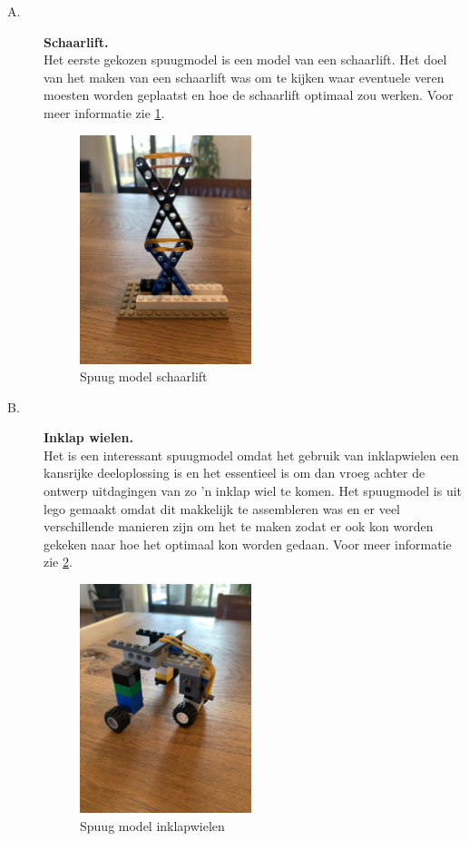 \begin{description}
\item[A.] {\bf Schaarlift.}\\ 
Het eerste gekozen spuugmodel is een model van een schaarlift. Het doel van het maken van een schaarlift was om te kijken waar eventuele veren moesten worden geplaatst en hoe de schaarlift optimaal zou werken.  Voor meer informatie zie \cref{fig:plaatje_schaarlift}.

\begin{figure}[H]
\centering

    \includegraphics[width = 50mm, angle =270 ]{04_idee_ontwikkeling/IMG_0892.jpg}
    \caption{Spuug model schaarlift}
    \label{fig:plaatje_schaarlift}
\end{figure}

\vspace{\baselineskip}

\item[B.] {\bf Inklap wielen.}\\
Het is een interessant spuugmodel omdat het gebruik van inklapwielen een kansrijke deeloplossing is en het essentieel is om dan vroeg achter de ontwerp uitdagingen van zo 'n inklap wiel te komen. Het spuugmodel is uit lego gemaakt omdat dit makkelijk te assembleren was en er veel verschillende manieren zijn om het te maken zodat er ook kon worden gekeken naar hoe het optimaal kon worden gedaan. Voor meer informatie zie \cref{fig:inklapwielen}. \\

\begin{figure}[H]
\centering

    \includegraphics[width = 50mm, angle = 270]{04_idee_ontwikkeling/Inklapwielen.jpg}
    \caption{Spuug model inklapwielen}
    \label{fig:inklapwielen}
\end{figure}


\end{description}
